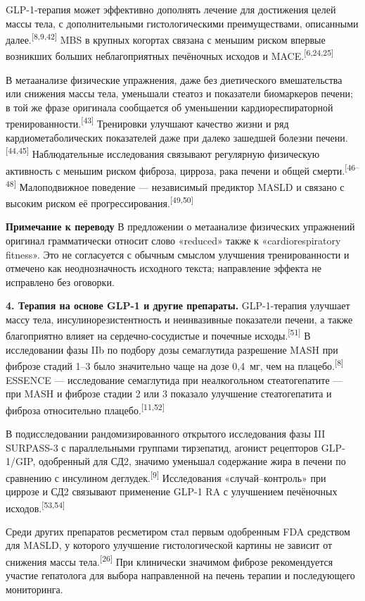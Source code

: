 \documentclass[11pt,a4paper]{article}
\newcommand{\src}[1]{\textsuperscript{[#1]}}
\newcommand{\editorial}[1]{\par\begingroup\small\color{black!70}\textbf{Примечание к переводу} #1\par\endgroup}
\begin{document}
GLP-1-терапия может эффективно дополнять лечение для достижения целей массы тела, с дополнительными гистологическими преимуществами, описанными далее.\src{8,9,42} MBS в крупных когортах связана с меньшим риском впервые возникших больших неблагоприятных печёночных исходов и MACE.\src{6,24,25}

В метаанализе физические упражнения, даже без диетического вмешательства или снижения массы тела, уменьшали стеатоз и показатели биомаркеров печени; в той же фразе оригинала сообщается об уменьшении кардиореспираторной тренированности.\src{43} Тренировки улучшают качество жизни и ряд кардиометаболических показателей даже при далеко зашедшей болезни печени.\src{44,45} Наблюдательные исследования связывают регулярную физическую активность с меньшим риском фиброза, цирроза, рака печени и общей смерти.\src{46--48} Малоподвижное поведение --- независимый предиктор MASLD и связано с высоким риском её прогрессирования.\src{49,50}
\editorial{В предложении о метаанализе физических упражнений оригинал грамматически относит слово «reduced» также к «cardiorespiratory fitness». Это не согласуется с обычным смыслом улучшения тренированности и отмечено как неоднозначность исходного текста; направление эффекта не исправлено без оговорки.}

\textbf{4. Терапия на основе GLP-1 и другие препараты.} GLP-1-терапия улучшает массу тела, инсулинорезистентность и неинвазивные показатели печени, а также благоприятно влияет на сердечно-сосудистые и почечные исходы.\src{51} В исследовании фазы IIb по подбору дозы семаглутида разрешение MASH при фиброзе стадий 1--3 было значительно чаще на дозе 0,4~мг, чем на плацебо.\src{8} ESSENCE --- исследование семаглутида при неалкогольном стеатогепатите --- при MASH и фиброзе стадии 2 или 3 показало улучшение стеатогепатита и фиброза относительно плацебо.\src{11,52}

В подисследовании рандомизированного открытого исследования фазы III SURPASS-3 с параллельными группами тирзепатид, агонист рецепторов GLP-1/GIP, одобренный для СД2, значимо уменьшал содержание жира в печени по сравнению с инсулином деглудек.\src{9} Исследования «случай--контроль» при циррозе и СД2 связывают применение GLP-1 RA с улучшением печёночных исходов.\src{53,54}

Среди других препаратов ресметиром стал первым одобренным FDA средством для MASLD, у которого улучшение гистологической картины не зависит от снижения массы тела.\src{26} При клинически значимом фиброзе рекомендуется участие гепатолога для выбора направленной на печень терапии и последующего мониторинга.
\end{document}
